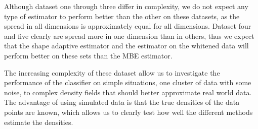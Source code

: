 Although dataset one through three differ in complexity, we do not expect any type of estimator to perform better than the other on these datasets, as the spread in all dimensions is approximately equal for all dimensions. Dataset four and five clearly are spread more in one dimension than in others, thus we expect that the shape adaptive estimator and the estimator on the whitened data will perform better on these sets than the MBE estimator.

The increasing complexity of these dataset allow us to investigate the performance of the classifier on simple situations, one cluster of data with some noise, to complex density fields that should better approximate real world data. The advantage of using simulated data is that the true densities of the data points are known, which allows us to clearly test how well the different methods estimate the densities.